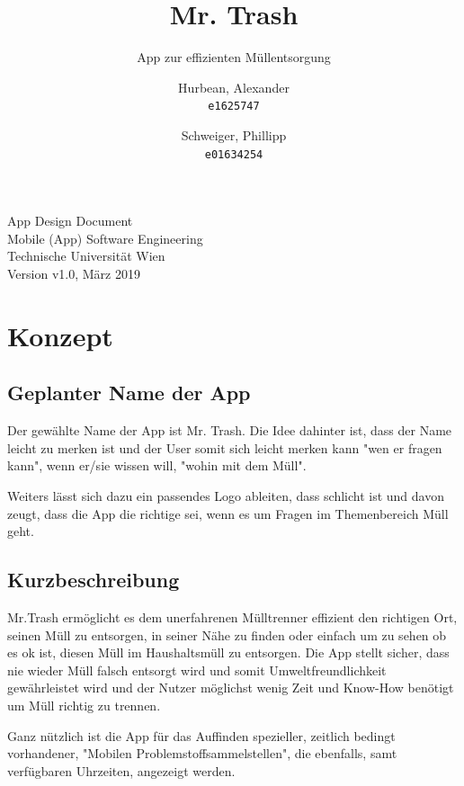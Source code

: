 \documentclass[a4paper]{scrreprt}
\title{Mr. Trash}
\subtitle{App zur effizienten Müllentsorgung}
\author{
    Hurbean, Alexander\\
    \texttt{e1625747}
    \and
    Schweiger, Phillipp\\
    \texttt{e01634254}}
\begin{document}
\maketitle

\null\vfill
\noindent
App Design Document\\ 
Mobile (App) Software Engineering\\
Technische Universität Wien\\
Version v1.0, März 2019\\
\newpage


\tableofcontents

\chapter{Konzept}

\section{Geplanter Name der App}
Der gewählte Name der App ist Mr. Trash. Die Idee dahinter ist, dass der Name leicht zu merken ist und der User somit sich leicht merken kann "wen er fragen kann", wenn er/sie wissen will, "wohin mit dem Müll".

Weiters lässt sich dazu ein passendes Logo ableiten, dass schlicht ist und davon zeugt, dass die App die richtige sei, wenn es um Fragen im Themenbereich Müll geht.

\section{Kurzbeschreibung}
Mr.Trash ermöglicht es dem unerfahrenen Mülltrenner effizient den richtigen Ort, seinen Müll zu entsorgen, in seiner Nähe zu finden oder einfach um zu sehen ob es ok ist, diesen Müll im Haushaltsmüll zu entsorgen. Die App stellt sicher, dass nie wieder Müll falsch entsorgt wird und somit Umweltfreundlichkeit gewährleistet wird und der Nutzer möglichst wenig Zeit und Know-How benötigt um Müll richtig zu trennen.

Ganz nützlich ist die App für das Auffinden spezieller, zeitlich bedingt vorhandener, "Mobilen Problemstoffsammelstellen", die ebenfalls, samt verfügbaren Uhrzeiten, angezeigt werden.
\end{document}
